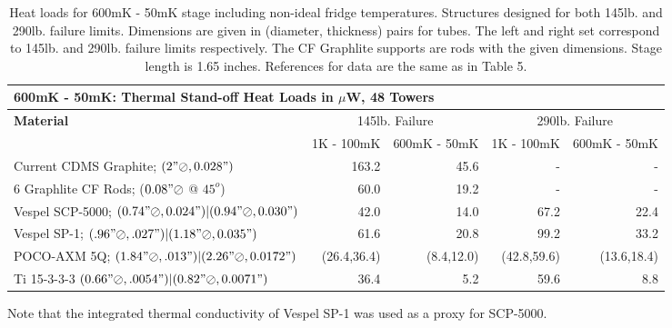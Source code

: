 \documentclass{article}
\begin{document}
\begin{table}[h]
\begin{small}
\begin{threeparttable}
\begin{tabular}{lrrrr}
  \multicolumn{5}{l}{{\Large 600mK - 50mK: Thermal Stand-off Heat Loads in $\mu$W, 48 Towers}} \\
\toprule
\bf{{\large Material}}& \multicolumn{2}{c}{145lb. Failure} & \multicolumn{2}{c}{290lb. Failure} \\
\cmidrule(r){2-5}
& 1K - 100mK & 600mK - 50mK & 1K - 100mK & 600mK - 50mK \\
Current CDMS Graphite; $(2"\oslash,0.028")$  & 163.2 & 45.6 & - & -\\
6 Graphlite CF Rods; ($0.08" \oslash$ @ $45^{o}$) & 60.0 & 19.2 & - & - \\
Vespel SCP-5000; $(0.74"\oslash,0.024")|(0.94"\oslash,0.030")$ & 42.0\tnote{\dag} & 14.0\tnote{\dag} & 67.2\tnote{\dag} & 22.4\tnote{\dag} \\
Vespel SP-1; $(.96"\oslash,.027")|(1.18"\oslash,0.035")$ & 61.6 & 20.8 & 99.2 & 33.2 \\
POCO-AXM 5Q; $(1.84"\oslash,.013")|(2.26"\oslash,0.0172")$ & (26.4,36.4) & (8.4,12.0) & (42.8,59.6) & (13.6,18.4) \\
Ti 15-3-3-3 $(0.66"\oslash,.0054")|(0.82"\oslash,0.0071")$ & 36.4\tnote{\S} & 5.2\tnote{\S} & 59.6\tnote{\S} & 8.8\tnote{\S} \\
\bottomrule
\end{tabular}
\begin{tablenotes}
\item[\dag] Note that the integrated thermal conductivity of Vespel SP-1 was used as a proxy for SCP-5000.
\end{tablenotes}
\end{threeparttable}
\caption{Heat loads for 600mK - 50mK stage including non-ideal fridge temperatures. Structures designed for both 145lb. and 290lb. failure limits. Dimensions are given in (diameter, thickness) pairs for tubes. The left and right set correspond to 145lb. and 290lb. failure limits respectively. The CF Graphlite supports are rods with the given dimensions. Stage length is 1.65 inches. References for data are the same as in Table 5.}
\end{small}
\end{table}
\end{document}
